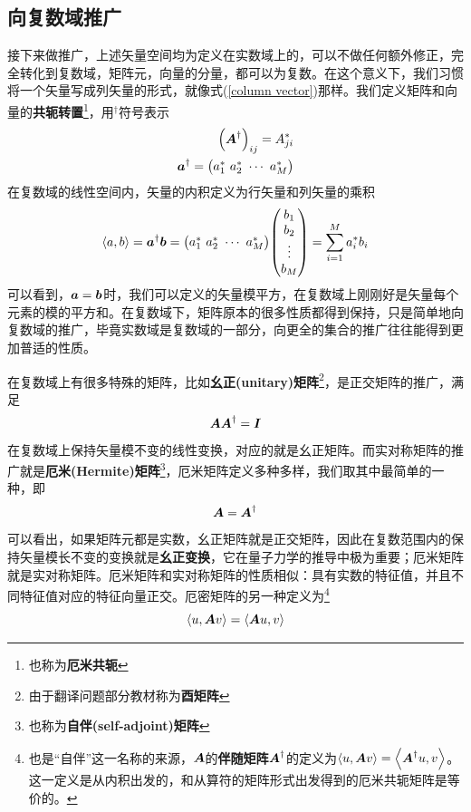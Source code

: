 \documentclass[12pt,a4paper,openany,twoside]{book}
\numberwithin{equation}{section}
\newcommand{\mean}[1]{\left\langle #1 \right\rangle}
\begin{document}
        \subsection{向复数域推广}
          \label{expansion_to_complex_field}
          接下来做推广，上述矢量空间均为定义在实数域上的，可以不做任何额外修正，完全转化到复数域，矩阵元，向量的分量，都可以为复数。在这个意义下，我们习惯将一个矢量写成列矢量的形式，就像式(\ref{column vector})那样。我们定义矩阵和向量的\textbf{共轭转置}\footnote{也称为\textbf{厄米共轭}}，用$^\dagger$符号表示
          \begin{equation}
            \begin{aligned}
              \qty(\vb*{A}^\dagger)_{i j}=A_{j i}^* \\
              \vb*{a}^\dagger=\mqty(a_1^*\ a_2^*\ \cdots\ a_M^*)
            \end{aligned}
          \end{equation}
          在复数域的线性空间内，矢量的内积定义为行矢量和列矢量的乘积
          \begin{equation}
            \mean{a,b}=\vb*{a}^\dagger\vb*{b}=\mqty(a_1^*\ a_2^*\ \cdots\ a_M^*) \mqty(
              b_1 \\
              b_2 \\
              \vdots \\
              b_M
            )=\sum_{i=1}^M{a_i^* b_i}
            \label{inner product in row and column }
          \end{equation}
          可以看到，$\vb*{a}=\vb*{b}$时，我们可以定义的矢量模平方，在复数域上刚刚好是矢量每个元素的模的平方和。在复数域下，矩阵原本的很多性质都得到保持，只是简单地向复数域的推广，毕竟实数域是复数域的一部分，向更全的集合的推广往往能得到更加普适的性质。

          在复数域上有很多特殊的矩阵，比如\textbf{幺正(unitary)矩阵}\footnote{由于翻译问题部分教材称为\textbf{酉矩阵}}，是正交矩阵的推广，满足
          \begin{equation}
            \vb*{A}\vb*{A}^\dagger=\vb*{I}
            \label{unitary def}
          \end{equation}
          在复数域上保持矢量模不变的线性变换，对应的就是幺正矩阵。而实对称矩阵的推广就是\textbf{厄米(Hermite)矩阵}\footnote{也称为\textbf{自伴(self-adjoint)矩阵}}，厄米矩阵定义多种多样，我们取其中最简单的一种，即
          \begin{equation}
            \vb*{A}=\vb*{A}^{\dagger}
          \end{equation}
          可以看出，如果矩阵元都是实数，幺正矩阵就是正交矩阵，因此在复数范围内的保持矢量模长不变的变换就是\textbf{幺正变换}，它在量子力学的推导中极为重要；厄米矩阵就是实对称矩阵。厄米矩阵和实对称矩阵的性质相似：具有实数的特征值，并且不同特征值对应的特征向量正交。厄密矩阵的另一种定义为\footnote{也是“自伴”这一名称的来源，$\vb*{A}$的\textbf{伴随矩阵}$\vb*{A}^\dagger$的定义为$\mean{u,\vb*{A}v}=\mean{\vb*{A}^\dagger u,v}$。这一定义是从内积出发的，和从算符的矩阵形式出发得到的厄米共轭矩阵是等价的。}
          \begin{equation}
            \mean{u,\vb*{A}v}=\mean{\vb*{A}u,v}
          \end{equation}
\end{document}
